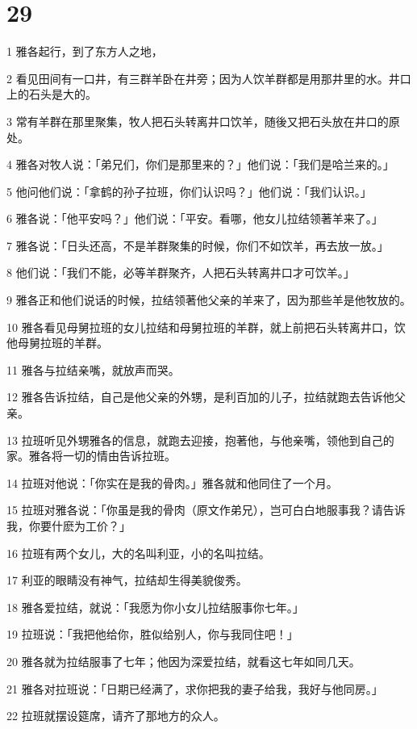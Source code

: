 \chapter{29}

\par 1 雅各起行，到了东方人之地，
\par 2 看见田间有一口井，有三群羊卧在井旁；因为人饮羊群都是用那井里的水。井口上的石头是大的。
\par 3 常有羊群在那里聚集，牧人把石头转离井口饮羊，随後又把石头放在井口的原处。
\par 4 雅各对牧人说：「弟兄们，你们是那里来的？」他们说：「我们是哈兰来的。」
\par 5 他问他们说：「拿鹤的孙子拉班，你们认识吗？」他们说：「我们认识。」
\par 6 雅各说：「他平安吗？」他们说：「平安。看哪，他女儿拉结领著羊来了。」
\par 7 雅各说：「日头还高，不是羊群聚集的时候，你们不如饮羊，再去放一放。」
\par 8 他们说：「我们不能，必等羊群聚齐，人把石头转离井口才可饮羊。」
\par 9 雅各正和他们说话的时候，拉结领著他父亲的羊来了，因为那些羊是他牧放的。
\par 10 雅各看见母舅拉班的女儿拉结和母舅拉班的羊群，就上前把石头转离井口，饮他母舅拉班的羊群。
\par 11 雅各与拉结亲嘴，就放声而哭。
\par 12 雅各告诉拉结，自己是他父亲的外甥，是利百加的儿子，拉结就跑去告诉他父亲。
\par 13 拉班听见外甥雅各的信息，就跑去迎接，抱著他，与他亲嘴，领他到自己的家。雅各将一切的情由告诉拉班。
\par 14 拉班对他说：「你实在是我的骨肉。」雅各就和他同住了一个月。
\par 15 拉班对雅各说：「你虽是我的骨肉（原文作弟兄），岂可白白地服事我？请告诉我，你要什麽为工价？」
\par 16 拉班有两个女儿，大的名叫利亚，小的名叫拉结。
\par 17 利亚的眼睛没有神气，拉结却生得美貌俊秀。
\par 18 雅各爱拉结，就说：「我愿为你小女儿拉结服事你七年。」
\par 19 拉班说：「我把他给你，胜似给别人，你与我同住吧！」
\par 20 雅各就为拉结服事了七年；他因为深爱拉结，就看这七年如同几天。
\par 21 雅各对拉班说：「日期已经满了，求你把我的妻子给我，我好与他同房。」
\par 22 拉班就摆设筵席，请齐了那地方的众人。
